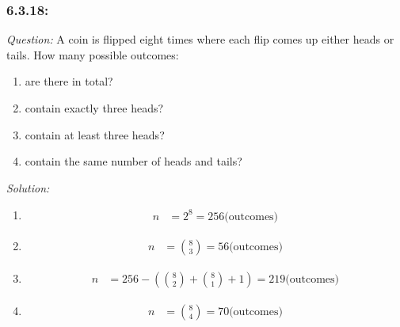 \documentclass[a4paper]{article}
\begin{document}
\subsubsection*{6.3.18:}
\textit{Question:} A coin is flipped eight times where each flip comes up
either heads or tails. How many possible outcomes:
\begin{enumerate} [label = (\alph*)]
	\item are there in total?
	\item contain exactly three heads?
	\item contain at least three heads?
	\item contain the same number of heads and tails?
\end{enumerate}
\textit{Solution:}\\
\begin{enumerate} [label = (\alph*)]
	\item 
	      \begin{align*}
		      n & = 2^{8} = 256 \text{(outcomes)}
	      \end{align*}
	\item 
	      \begin{align*}
		      n & = {8 \choose 3} = 56 \text{(outcomes)}
	      \end{align*}
	\item 
	      \begin{align*}
		      n & = 256 - ( {8\choose 2} + {8 \choose 1} + 1) = 219 \text{(outcomes)}
	      \end{align*}
	\item 
	      \begin{align*}
		      n & = {8 \choose 4} = 70 \text{(outcomes)}
	      \end{align*}
\end{enumerate}

\end{document}
